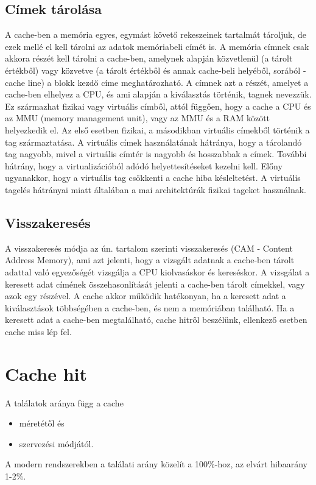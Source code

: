 \subsection{Címek tárolása}
A cache-ben a memória egyes, egymást követő rekeszeinek tartalmát tároljuk, de ezek mellé el kell tárolni az adatok memóriabeli címét is.
A memória címnek csak akkora részét kell tárolni a cache-ben, amelynek alapján közvetlenül (a tárolt értékből) vagy közvetve (a tárolt értékből és annak cache-beli helyéből, sorából - cache line) a blokk kezdő címe meghatározható.
A címnek azt a részét, amelyet a cache-ben elhelyez a CPU, és ami alapján a kiválasztás történik, tagnek nevezzük.
Ez származhat fizikai vagy virtuális címből, attól függően, hogy a cache a CPU és az MMU (memory management unit), vagy az MMU és a RAM között helyezkedik el.
Az első esetben fizikai, a másodikban virtuális címekből történik a tag származtatása.
A virtuális címek használatának hátránya, hogy a tárolandó tag nagyobb, mivel a virtuális címtér is nagyobb és hosszabbak a címek.
További hátrány, hogy a virtualizációból adódó helyettesítéseket kezelni kell.
Előny ugyanakkor, hogy a virtuális tag csökkenti a cache hiba késleltetést.
A virtuális tagelés hátrányai miatt általában a mai architektúrák fizikai tageket használnak.

\subsection{Visszakeresés}
A visszakeresés módja az ún. tartalom szerinti visszakeresés (CAM - Content Address Memory), ami azt jelenti, hogy a vizsgált adatnak a cache-ben tárolt adattal való egyezőségét vizsgálja a CPU kiolvasáskor és kereséskor.
A vizsgálat a keresett adat címének összehasonlítását jelenti a cache-ben tárolt címekkel, vagy azok egy részével.
A cache akkor működik hatékonyan, ha a keresett adat a kiválasztások többségében a cache-ben, és nem a memóriában található.
Ha a keresett adat a cache-ben megtalálható, cache hitről beszélünk, ellenkező esetben cache miss lép fel.

\section{Cache hit}
A találatok aránya függ a cache
\begin{itemize}
    \item méretétől és
    \item szervezési módjától.
\end{itemize}
A modern rendszerekben a találati arány közelít a 100\%-hoz, az elvárt hibaarány 1-2\%.

